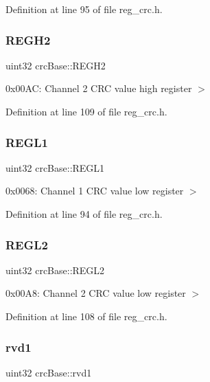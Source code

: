 Definition at line 95 of file reg\+\_\+crc.\+h.

\mbox{\label{structcrcBase_ace2e4c81c9e3f65651ce6eb0e703763c}} 
\subsubsection{\texorpdfstring{R\+E\+G\+H2}{REGH2}}
{\footnotesize\ttfamily uint32 crc\+Base\+::\+R\+E\+G\+H2}

0x00\+AC\+: Channel 2 C\+RC value high register $>$ 

Definition at line 109 of file reg\+\_\+crc.\+h.

\mbox{\label{structcrcBase_a01161aa3b05450d54d12c62c86f4a766}} 
\subsubsection{\texorpdfstring{R\+E\+G\+L1}{REGL1}}
{\footnotesize\ttfamily uint32 crc\+Base\+::\+R\+E\+G\+L1}

0x0068\+: Channel 1 C\+RC value low register $>$ 

Definition at line 94 of file reg\+\_\+crc.\+h.

\mbox{\label{structcrcBase_abaa217c05004190b7da6d2c4c9f65c89}} 
\subsubsection{\texorpdfstring{R\+E\+G\+L2}{REGL2}}
{\footnotesize\ttfamily uint32 crc\+Base\+::\+R\+E\+G\+L2}

0x00\+A8\+: Channel 2 C\+RC value low register $>$ 

Definition at line 108 of file reg\+\_\+crc.\+h.

\mbox{\label{structcrcBase_a5a8f9d67607b304364cb0748a1ca8f3b}} 
\subsubsection{\texorpdfstring{rvd1}{rvd1}}
{\footnotesize\ttfamily uint32 crc\+Base\+::rvd1}

